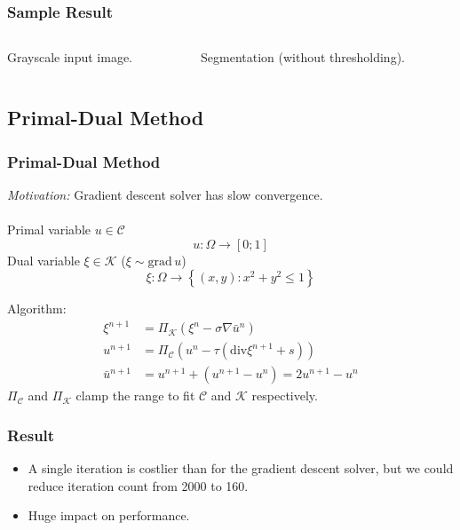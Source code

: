 \documentclass{beamer}
\begin{document}
\begin{frame}
  \frametitle{Sample Result}
  \begin{columns}[t]
    \begin{column}{.4\textwidth}
      Grayscale input image.
    \end{column}
    \begin{column}{.4\textwidth}
      Segmentation (without thresholding).
    \end{column}
  \end{columns}
\end{frame}

\subsection{Primal-Dual Method}

\begin{frame}
  \frametitle{Primal-Dual Method}
  \emph{Motivation:} Gradient descent solver has slow convergence.
  \\~\\
  Primal variable $ u \in \mathcal{C} $
  \begin{equation*}
    u : \Omega \to [0; 1]
  \end{equation*}
  Dual variable $ \xi \in \mathcal{K} $ \quad ($ \xi \sim \mathrm{grad} \, u $)
  \begin{equation*}
    \xi : \Omega \to \left\{ (x, y) : x^2 + y^2 \le 1 \right\}
  \end{equation*}

  Algorithm:
  \begin{align*}
    \xi^{n+1} &= \Pi_{\mathcal{K}}(\xi^n - \sigma \nabla \bar{u}^n)
    \\
    u^{n+1} &= \Pi_{\mathcal{C}}(u^n - \tau (\mathrm{div} \xi^{n+1} + s))
    \\
    \bar{u}^{n+1} &= u^{n+1} + (u^{n+1} - u^n) = 2 u^{n+1} - u^n
  \end{align*}
  $ \Pi_{\mathcal{C}} $ and $ \Pi_{\mathcal{K}} $ clamp the range to fit $ \mathcal{C} $ and $ \mathcal{K} $ respectively.
\end{frame}

\begin{frame}
  \frametitle{Result}
  \begin{itemize}
  \item A single iteration is costlier than for the gradient descent solver, but we could reduce iteration count from 2000 to 160.
  \item Huge impact on performance.
  \end{itemize}
\end{frame}
\end{document}
